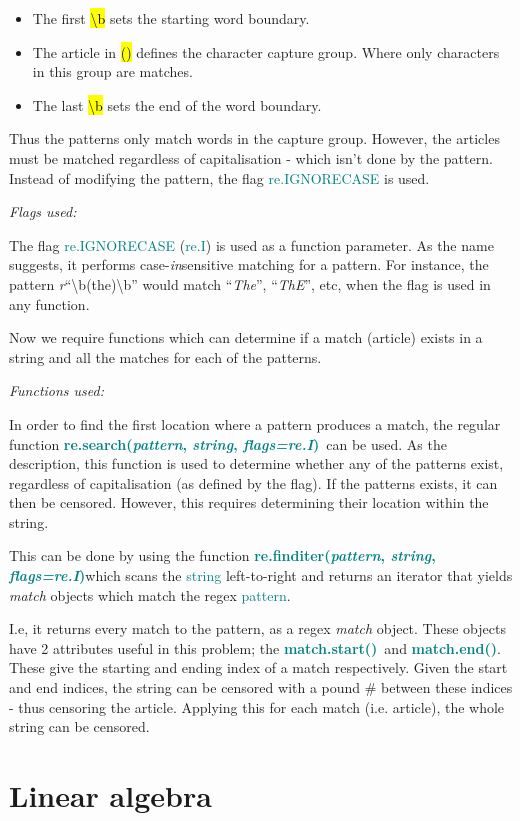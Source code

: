 \documentclass[a4paper]{article}
\newcommand \search {\textcolor{teal}{\textbf{re.search(\emph{pattern}, \emph{string}, \emph{flags=re.I})}}}
\newcommand \finditer {\textcolor{teal}{\textbf{re.finditer(\emph{pattern}, \emph{string}, \emph{flags=re.I})}}}
\newcommand \matchStart {\textcolor{teal}{\textbf{match.start()}}}
\newcommand \matchEnd {\textcolor{teal}{\textbf{match.end()}}}
\begin{document}
\begin{itemize}
    \item The first \hl{\textbackslash b} sets the starting word boundary.
    \item The article in \hl{()} defines the character capture group. Where only characters in this group are matches.
    \item The last \hl{\textbackslash b} sets the end of the word boundary.
\end{itemize}
Thus the patterns only match words in the capture group. However, the articles must be matched regardless of capitalisation - which isn't done by the pattern. Instead of modifying the pattern, the flag \textcolor{teal}{re.IGNORECASE} is used.
\vspace{5mm}


\noindent
\emph{Flags used:}
\vspace{2mm}

\noindent
The flag \textcolor{teal}{re.IGNORECASE} (\textcolor{teal}{re.I}) is used as a function parameter. As the name suggests, it performs case-\emph{in}sensitive matching for a pattern. For instance, the pattern \emph{r}\enquote{\textbackslash b(the)\textbackslash b} would match \enquote{\emph{The}}, \enquote{\emph{ThE}}, etc, when the flag is used in any function.

Now we require functions which can determine if a match (article) exists in a string and all the matches for each of the patterns.
\vspace{5mm}

\noindent
\emph{Functions used:}
\vspace{2mm}

\noindent
In order to find the first location where a pattern produces a match, the regular function \search \ can be used. As the description, this function is used to determine whether any of the patterns exist, regardless of capitalisation (as defined by the flag). If the patterns exists, it can then be censored. However, this requires determining their location within the string.
\vspace{2mm}

\noindent
This can be done by using the function \finditer which scans the \textcolor{teal}{string} left-to-right and returns an iterator that yields \emph{match} objects which match the regex \textcolor{teal}{pattern}.

I.e, it returns every match to the pattern, as a regex \emph{match} object. These objects have 2 attributes useful in this problem; the \matchStart \ and \matchEnd. These give the starting and ending index of a match respectively. Given the start and end indices, the string can be censored with a pound \# between these indices - thus censoring the article. Applying this for each match (i.e. article), the whole string can be censored.


\section{Linear algebra}
\end{document}
